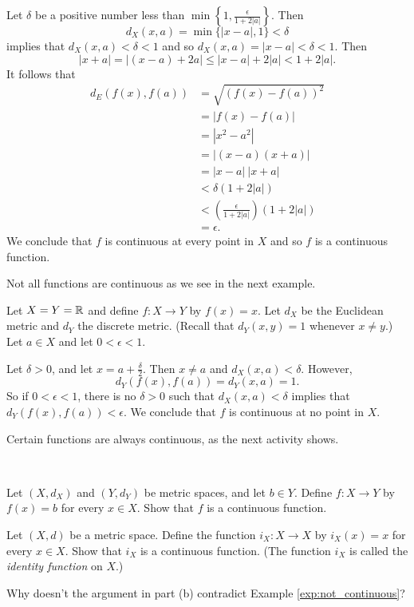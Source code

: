 \begin{example}
\noindent Let $\delta$ be a positive number less than $\min\left\{1, \frac{\epsilon}{1+2|a|}\right\}$. Then 
\[d_X(x,a) = \min\{|x-a|,1\} < \delta\]
implies that $d_X(x,a) < \delta < 1$ and so $d_X(x,a) = |x-a| < \delta < 1$. Then
\[|x+a| = |(x-a) + 2a| \leq |x-a| + 2|a| < 1+2|a|.\]
It follows that
\begin{align*}
d_E(f(x),f(a)) &= \sqrt{(f(x)-f(a))^2} \\
	&= |f(x)-f(a)| \\
	&= |x^2-a^2| \\
	&= |(x-a)(x+a)| \\
	&= |x-a| \ |x+a| \\
	&< \delta (1+2|a|) \\
	&<  \left(\frac{\epsilon}{1+2|a|}\right) (1+2|a|) \\
	&= \epsilon.
\end{align*}
We conclude that $f$ is continuous at every point in $X$ and so $f$ is a continuous function.
\end{example}

Not all functions are continuous as we see in the next example. 

\begin{example} \label{exp:not_continuous} Let $X = Y = \mathbb{R}$ and define $f : X \to Y$  by $f(x) = x$. Let $d_X$ be the Euclidean metric and $d_Y$ the discrete metric. (Recall that $d_Y(x,y) = 1$ whenever $x \neq y$.) Let $a \in X$ and let $0 < \epsilon < 1$. 
 
Let $\delta > 0$, and let $x = a+\frac{\delta}{2}$. Then $x \neq a$ and $d_X(x,a) < \delta$. However, 
\[d_Y(f(x),f(a)) = d_Y(x,a) = 1.\]
So if $0 < \epsilon < 1$, there is no $\delta > 0$ such that $d_X(x,a) < \delta$ implies that $d_Y(f(x),f(a)) < \epsilon$. We conclude that $f$ is continuous at no point in $X$.  
\end{example}

Certain functions are always continuous, as the next activity shows.

\begin{activity} \label{act:id_constant_continuous} ~ 
	\ba
	\item Let $(X, d_X)$ and $(Y, d_Y)$ be metric spaces, and let $b \in Y$. Define $f : X \to Y$ by $f(x) = b$ for every $x \in X$. Show that $f$ is a continuous function.
		
	\item Let $(X, d)$ be a metric space. Define the function $i_X : X \to X$ by $i_X(x) = x$ for every $x \in X$. Show that $i_X$ is a continuous function. (The function $i_X$ is called the \emph{identity function} on $X$.)
	
	\item Why doesn't the argument in part (b) contradict Example \ref{exp:not_continuous}?
		
	\ea
\end{activity}


